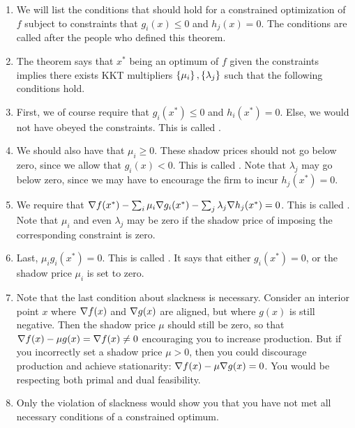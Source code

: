\documentclass[11pt, oneside]{amsart}
\begin{document}
\begin{enumerate}
  \item We will list the conditions that should hold for a constrained
  optimization of $f$ subject to constraints that $g_i(x) \leq 0$ and
  $h_j(x) = 0$. The conditions are called  after
  the people who defined this theorem.

  \item The theorem says that $x^*$ being an optimum of $f$ given the
  constraints implies there exists KKT multipliers $\left\{ \mu_i \right\},
  \left\{ \lambda_j \right\}$ such that the following conditions hold.

  \item First, we of course require that $g_i(x^*) \leq 0$ and $h_i(x^*)
  = 0$. Else, we would not have obeyed the constraints. This is called
  .

  \item We should also have that $\mu_i \geq 0$. These shadow prices
  should not go below zero, since we allow that $g_i(x) < 0$. This is
  called . Note that $\lambda_j$ may go below
  zero, since we may have to encourage the firm to incur $h_j(x^*) = 0$.

  \item We require that $\nabla f(x^*) - \sum_i \mu_i \nabla g_i(x^*) -
  \sum_j \lambda_j \nabla h_j(x^*) = 0$. This is called
  . Note that $\mu_i$ and even $\lambda_j$ may be
  zero if the shadow price of imposing the corresponding constraint is
  zero.

  \item Last, $\mu_i g_i(x^*) = 0$. This is called .
  It says that either $g_i(x^*) = 0$, or the shadow price $\mu_i$ is set
  to zero.

  \item Note that the last condition about slackness is necessary.
  Consider an interior point $x$ where $\nabla f(x)$ and $\nabla g(x)$ are
  aligned, but where $g(x)$ is still negative. Then the shadow price
  $\mu$ should still be zero, so that $\nabla f(x) - \mu g(x) = \nabla
  f(x) \ne 0$ encouraging you to increase production. But if you
  incorrectly set a shadow price $\mu > 0$, then you could discourage
  production and achieve stationarity: $\nabla f(x) - \mu \nabla g(x) =
  0$. You would be respecting both primal and dual feasibility.

  \item Only the violation of slackness would show you that you have not
  met all necessary conditions of a constrained optimum.


\end{enumerate}
\end{document}
